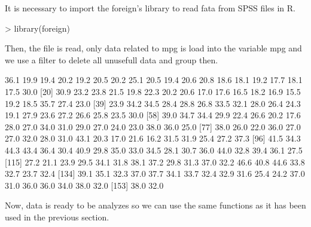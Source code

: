 \documentclass[a4paper]{article}
\begin{document}
	It is necessary to import the foreign's library to read fata from SPSS files in R.
\begin{Schunk}
\begin{Sinput}
> library(foreign)
\end{Sinput}
\end{Schunk}
	Then, the file is read, only data related to mpg is load into the variable mpg
	and we use a filter to delete all unusefull data and group then.
\begin{Schunk}
\begin{Soutput}
  [1] 36.1 19.9 19.4 20.2 19.2 20.5 20.2 25.1 20.5 19.4 20.6 20.8 18.6 18.1 19.2 17.7 18.1 17.5 30.0
 [20] 30.9 23.2 23.8 21.5 19.8 22.3 20.2 20.6 17.0 17.6 16.5 18.2 16.9 15.5 19.2 18.5 35.7 27.4 23.0
 [39] 23.9 34.2 34.5 28.4 28.8 26.8 33.5 32.1 28.0 26.4 24.3 19.1 27.9 23.6 27.2 26.6 25.8 23.5 30.0
 [58] 39.0 34.7 34.4 29.9 22.4 26.6 20.2 17.6 28.0 27.0 34.0 31.0 29.0 27.0 24.0 23.0 38.0 36.0 25.0
 [77] 38.0 26.0 22.0 36.0 27.0 27.0 32.0 28.0 31.0 43.1 20.3 17.0 21.6 16.2 31.5 31.9 25.4 27.2 37.3
 [96] 41.5 34.3 44.3 43.4 36.4 30.4 40.9 29.8 35.0 33.0 34.5 28.1 30.7 36.0 44.0 32.8 39.4 36.1 27.5
[115] 27.2 21.1 23.9 29.5 34.1 31.8 38.1 37.2 29.8 31.3 37.0 32.2 46.6 40.8 44.6 33.8 32.7 23.7 32.4
[134] 39.1 35.1 32.3 37.0 37.7 34.1 33.7 32.4 32.9 31.6 25.4 24.2 37.0 31.0 36.0 36.0 34.0 38.0 32.0
[153] 38.0 32.0
\end{Soutput}
\end{Schunk}

	Now, data is ready to be analyzes so we can use the same functions as it has been used 
	in the previous section.

			
		
\end{document}

